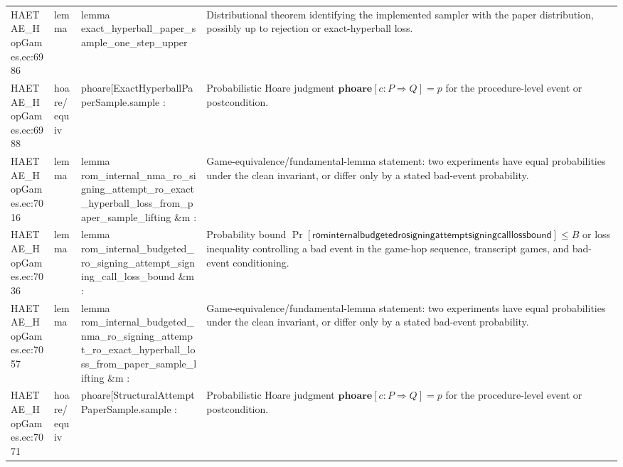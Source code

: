 \documentclass[10pt]{article}
\begin{document}
\begin{longtable}{L{0.11\textwidth}L{0.055\textwidth}L{0.385\textwidth}L{0.41\textwidth}}
HAETAE\_\allowbreak{}HopGames.\allowbreak{}ec:\allowbreak{}6986 & lemma & {\ttfamily\scriptsize lemma exact\_\allowbreak{}hyperball\_\allowbreak{}paper\_\allowbreak{}sample\_\allowbreak{}one\_\allowbreak{}step\_\allowbreak{}upper} & Distributional theorem identifying the implemented sampler with the paper distribution, possibly up to rejection or exact-hyperball loss. \\
HAETAE\_\allowbreak{}HopGames.\allowbreak{}ec:\allowbreak{}6988 & hoare/equiv & {\ttfamily\scriptsize phoare[ExactHyperballPaperSample.sample :} & Probabilistic Hoare judgment $\mathbf{phoare}[c:P\Rightarrow Q]=p$ for the procedure-level event or postcondition. \\
HAETAE\_\allowbreak{}HopGames.\allowbreak{}ec:\allowbreak{}7016 & lemma & {\ttfamily\scriptsize lemma rom\_\allowbreak{}internal\_\allowbreak{}nma\_\allowbreak{}ro\_\allowbreak{}signing\_\allowbreak{}attempt\_\allowbreak{}ro\_\allowbreak{}exact\_\allowbreak{}hyperball\_\allowbreak{}loss\_\allowbreak{}from\_\allowbreak{}paper\_\allowbreak{}sample\_\allowbreak{}lifting \&m :} & Game-equivalence/fundamental-lemma statement: two experiments have equal probabilities under the clean invariant, or differ only by a stated bad-event probability. \\
HAETAE\_\allowbreak{}HopGames.\allowbreak{}ec:\allowbreak{}7036 & lemma & {\ttfamily\scriptsize lemma rom\_\allowbreak{}internal\_\allowbreak{}budgeted\_\allowbreak{}ro\_\allowbreak{}signing\_\allowbreak{}attempt\_\allowbreak{}signing\_\allowbreak{}call\_\allowbreak{}loss\_\allowbreak{}bound \&m :} & Probability bound $\Pr[\mathsf{rominternalbudgetedrosigningattemptsigningcalllossbound}]\le B$ or loss inequality controlling a bad event in the game-hop sequence, transcript games, and bad-event conditioning. \\
HAETAE\_\allowbreak{}HopGames.\allowbreak{}ec:\allowbreak{}7057 & lemma & {\ttfamily\scriptsize lemma rom\_\allowbreak{}internal\_\allowbreak{}budgeted\_\allowbreak{}nma\_\allowbreak{}ro\_\allowbreak{}signing\_\allowbreak{}attempt\_\allowbreak{}ro\_\allowbreak{}exact\_\allowbreak{}hyperball\_\allowbreak{}loss\_\allowbreak{}from\_\allowbreak{}paper\_\allowbreak{}sample\_\allowbreak{}lifting \&m :} & Game-equivalence/fundamental-lemma statement: two experiments have equal probabilities under the clean invariant, or differ only by a stated bad-event probability. \\
HAETAE\_\allowbreak{}HopGames.\allowbreak{}ec:\allowbreak{}7071 & hoare/equiv & {\ttfamily\scriptsize phoare[StructuralAttemptPaperSample.sample :} & Probabilistic Hoare judgment $\mathbf{phoare}[c:P\Rightarrow Q]=p$ for the procedure-level event or postcondition. \\

\end{longtable}
\end{document}
